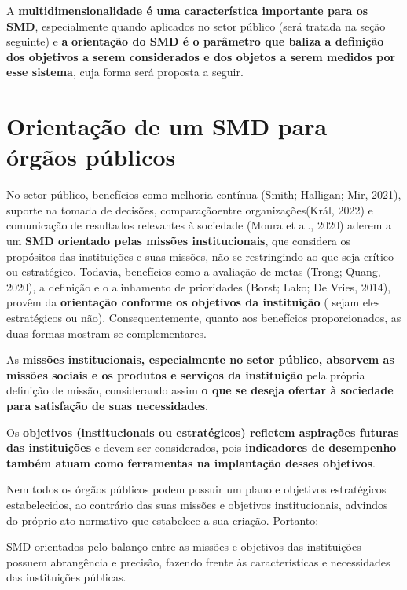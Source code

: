 \documentclass[
  letterpaper,
  DIV=11,
  numbers=noendperiod]{scrreprt}
\begin{document}
A \textbf{multidimensionalidade é uma característica importante para os
SMD}, especialmente quando aplicados no setor público (será tratada na
seção seguinte) e \textbf{a} \textbf{orientação do SMD é o parâmetro que
baliza a definição dos objetivos a serem considerados e dos objetos a
serem medidos por esse sistema}, cuja forma será proposta a seguir.

\hypertarget{orientauxe7uxe3o-de-um-smd-para-uxf3rguxe3os-puxfablicos}{%
\section{Orientação de um SMD para órgãos
públicos}\label{orientauxe7uxe3o-de-um-smd-para-uxf3rguxe3os-puxfablicos}}

No setor público, benefícios como melhoria contínua (Smith; Halligan;
Mir, 2021), suporte na tomada de decisões, comparaçãoentre
organizações(Král, 2022) e comunicação de resultados relevantes à
sociedade (Moura et al., 2020) aderem a um \textbf{SMD orientado pelas
missões institucionais}, que considera os propósitos das instituições e
suas missões, não se restringindo ao que seja crítico ou estratégico.
Todavia, benefícios como a avaliação de metas (Trong; Quang, 2020), a
definição e o alinhamento de prioridades (Borst; Lako; De Vries, 2014),
provêm da \textbf{orientação conforme os objetivos da instituição} (
sejam eles estratégicos ou não). Consequentemente, quanto aos benefícios
proporcionados, as duas formas mostram-se complementares.

As \textbf{missões institucionais, especialmente no setor público,
absorvem as missões sociais e os produtos e serviços da instituição}
pela própria definição de missão, considerando assim \textbf{o que se
deseja ofertar à sociedade para satisfação de suas necessidades}.

Os \textbf{objetivos (institucionais ou estratégicos) refletem
aspirações futuras das instituições} e devem ser considerados, pois
\textbf{indicadores de desempenho também atuam como ferramentas na
implantação desses objetivos}.

Nem todos os órgãos públicos podem possuir um plano e objetivos
estratégicos estabelecidos, ao contrário das suas missões e objetivos
institucionais, advindos do próprio ato normativo que estabelece a sua
criação. Portanto:

\begin{tcolorbox}[enhanced jigsaw, colframe=quarto-callout-warning-color-frame, opacityback=0, toprule=.15mm, breakable, leftrule=.75mm, title=\textcolor{quarto-callout-warning-color}{\faExclamationTriangle}\hspace{0.5em}{Importante}, rightrule=.15mm, colbacktitle=quarto-callout-warning-color!10!white, colback=white, arc=.35mm, bottomtitle=1mm, toptitle=1mm, bottomrule=.15mm, titlerule=0mm, opacitybacktitle=0.6, coltitle=black, left=2mm]

SMD orientados pelo balanço entre as missões e objetivos das
instituições possuem abrangência e precisão, fazendo frente às
características e necessidades das instituições públicas.

\end{tcolorbox}
\end{document}

